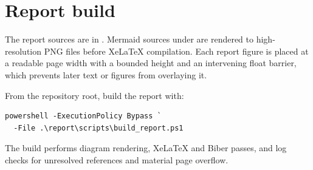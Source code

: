 \section{Report build}

The report sources are in . Mermaid sources under  are rendered to high-resolution PNG files before XeLaTeX compilation. Each report figure is placed at a readable page width with a bounded height and an intervening float barrier, which prevents later text or figures from overlaying it.

From the repository root, build the report with:

\begin{lstlisting}[language={},caption={Project report build command.}]
powershell -ExecutionPolicy Bypass `
  -File .\report\scripts\build_report.ps1
\end{lstlisting}

The build performs diagram rendering, XeLaTeX and Biber passes, and log checks for unresolved references and material page overflow.
